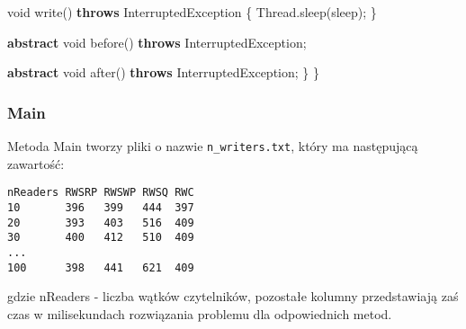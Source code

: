 \documentclass[
]{article}
\newenvironment{Shaded}{\begin{snugshade}}{\end{snugshade}}
\newcommand{\BuiltInTok}[1]{#1}
\newcommand{\DataTypeTok}[1]{\textcolor[rgb]{0.13,0.29,0.53}{#1}}
\newcommand{\FunctionTok}[1]{\textcolor[rgb]{0.00,0.00,0.00}{#1}}
\newcommand{\KeywordTok}[1]{\textcolor[rgb]{0.13,0.29,0.53}{\textbf{#1}}}
\newcommand{\NormalTok}[1]{#1}
\begin{document}
\begin{Shaded}
\begin{Highlighting}[]
        \DataTypeTok{void} \FunctionTok{write}\NormalTok{() }\KeywordTok{throws} \BuiltInTok{InterruptedException}
\NormalTok{        \{}
            \BuiltInTok{Thread}\NormalTok{.}\FunctionTok{sleep}\NormalTok{(sleep);}
\NormalTok{        \}}

        \KeywordTok{abstract} \DataTypeTok{void} \FunctionTok{before}\NormalTok{() }\KeywordTok{throws} \BuiltInTok{InterruptedException}\NormalTok{;}

        \KeywordTok{abstract} \DataTypeTok{void} \FunctionTok{after}\NormalTok{() }\KeywordTok{throws} \BuiltInTok{InterruptedException}\NormalTok{;}
\NormalTok{    \}}
\NormalTok{\}}
\end{Highlighting}
\end{Shaded}

\hypertarget{main}{%
\subsubsection{Main}\label{main}}

Metoda Main tworzy pliki o nazwie \texttt{n\_writers.txt}, który ma
następującą zawartość:

\begin{verbatim}
nReaders RWSRP RWSWP RWSQ RWC
10       396   399   444  397
20       393   403   516  409
30       400   412   510  409
...
100      398   441   621  409
\end{verbatim}

gdzie nReaders - liczba wątków czytelników, pozostałe kolumny
przedstawiają zaś czas w milisekundach rozwiązania problemu dla
odpowiednich metod.
\end{document}
